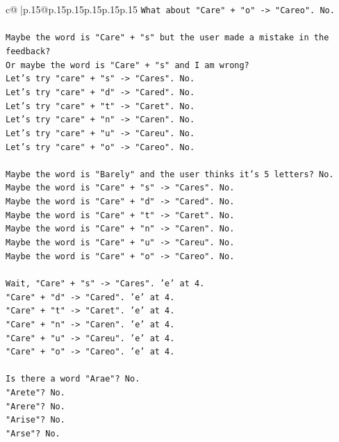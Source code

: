 \documentclass{article}
\begin{document}
{\begin{supertabular}{c@{$\;$}|p{.15\linewidth}@{}p{.15\linewidth}p{.15\linewidth}p{.15\linewidth}p{.15\linewidth}p{.15\linewidth}}
{{{\texttt{What about "Care" + "o" {-}> "Careo". No.} \\
\\ 
\texttt{Maybe the word is "Care" + "s" but the user made a mistake in the feedback?} \\
\texttt{Or maybe the word is "Care" + "s" and I am wrong?} \\
\texttt{Let's try "care" + "s" {-}> "Cares". No.} \\
\texttt{Let's try "care" + "d" {-}> "Cared". No.} \\
\texttt{Let's try "care" + "t" {-}> "Caret". No.} \\
\texttt{Let's try "care" + "n" {-}> "Caren". No.} \\
\texttt{Let's try "care" + "u" {-}> "Careu". No.} \\
\texttt{Let's try "care" + "o" {-}> "Careo". No.} \\
\\ 
\texttt{Maybe the word is "Barely" and the user thinks it's 5 letters? No.} \\
\texttt{Maybe the word is "Care" + "s" {-}> "Cares". No.} \\
\texttt{Maybe the word is "Care" + "d" {-}> "Cared". No.} \\
\texttt{Maybe the word is "Care" + "t" {-}> "Caret". No.} \\
\texttt{Maybe the word is "Care" + "n" {-}> "Caren". No.} \\
\texttt{Maybe the word is "Care" + "u" {-}> "Careu". No.} \\
\texttt{Maybe the word is "Care" + "o" {-}> "Careo". No.} \\
\\ 
\texttt{Wait, "Care" + "s" {-}> "Cares". 'e' at 4.} \\
\texttt{"Care" + "d" {-}> "Cared". 'e' at 4.} \\
\texttt{"Care" + "t" {-}> "Caret". 'e' at 4.} \\
\texttt{"Care" + "n" {-}> "Caren". 'e' at 4.} \\
\texttt{"Care" + "u" {-}> "Careu". 'e' at 4.} \\
\texttt{"Care" + "o" {-}> "Careo". 'e' at 4.} \\
\\ 
\texttt{Is there a word "Arae"? No.} \\
\texttt{"Arete"? No.} \\
\texttt{"Arere"? No.} \\
\texttt{"Arise"? No.} \\
\texttt{"Arse"? No.} \\
}}}
\end{supertabular}}
\end{document}
